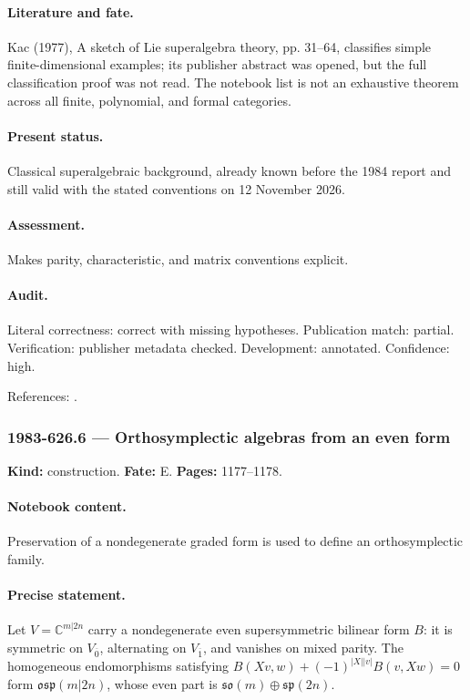 \paragraph{Literature and fate.} Kac (1977), A sketch of Lie superalgebra theory, pp. 31–64, classifies simple finite-dimensional examples; its publisher abstract was opened, but the full classification proof was not read. The notebook list is not an exhaustive theorem across all finite, polynomial, and formal categories.

\paragraph{Present status.} Classical superalgebraic background, already known before the 1984 report and still valid with the stated conventions on 12 November 2026.

\paragraph{Assessment.} Makes parity, characteristic, and matrix conventions explicit.

\paragraph{Audit.} Literal correctness: correct with missing hypotheses. Publication match: partial. Verification: publisher metadata checked. Development: annotated. Confidence: high.

\noindent References: \citep{kac1977sketch}.\par

\subsubsection{1983-626.6 --- Orthosymplectic algebras from an even form}

\label{item:1983-626.6}

\noindent\textbf{Kind:} construction. \textbf{Fate:} E. \textbf{Pages:} 1177--1178.\par

\paragraph{Notebook content.} Preservation of a nondegenerate graded form is used to define an orthosymplectic family.

\paragraph{Precise statement.} Let \(V=\mathbb C^{m|2n}\) carry a nondegenerate even supersymmetric bilinear form \(B\): it is symmetric on \(V_{\overline0}\), alternating on \(V_{\overline1}\), and vanishes on mixed parity. The homogeneous endomorphisms satisfying \(B(Xv,w)+(-1)^{|X||v|}B(v,Xw)=0\) form \(\mathfrak{osp}(m|2n)\), whose even part is \(\mathfrak{so}(m)\oplus\mathfrak{sp}(2n)\).


